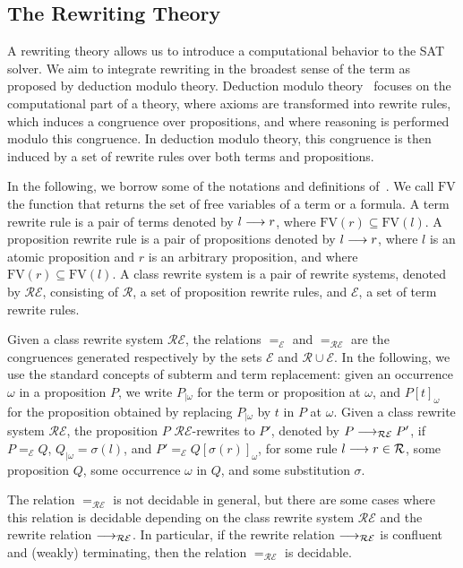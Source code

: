 \subsection{The Rewriting Theory}
\label{sec:rew}

A rewriting theory allows us to introduce a computational behavior to the SAT
solver. We aim to integrate rewriting in the broadest sense of the term as
proposed by deduction modulo theory. Deduction modulo theory~\cite{DA03} focuses
on the computational part of a theory, where axioms are transformed into rewrite
rules, which induces a congruence over propositions, and where reasoning is
performed modulo this congruence. In deduction modulo theory, this congruence is
then induced by a set of rewrite rules over both terms and propositions.

In the following, we borrow some of the notations and definitions
of~\cite{DA03}. We call $\mathrm{FV}$ the function that returns the set of
free variables of a term or a formula. A term rewrite rule is a pair of terms
denoted by $l\longrightarrow{}r$, where $\mathrm{FV}(r)\subseteq\mathrm{FV}(l)$. A
proposition rewrite rule is a pair of propositions denoted by $l\longrightarrow{}r$, where
$l$ is an atomic proposition and $r$ is an arbitrary proposition, and where
$\mathrm{FV}(r)\subseteq\mathrm{FV}(l)$. A class rewrite system is a pair of
rewrite systems, denoted by $\mathcal{RE}$, consisting of $\mathcal{R}$, a set
of proposition rewrite rules, and $\mathcal{E}$, a set of term rewrite rules.

Given a class rewrite system $\mathcal{RE}$, the relations $=_\mathcal{E}$ and
$=_\mathcal{RE}$ are the congruences generated respectively by the sets
$\mathcal{E}$ and $\mathcal{R}\cup\mathcal{E}$. In the following, we use the
standard concepts of subterm and term replacement: given an occurrence $\omega$
in a proposition $P$, we write $P_{|\omega}$ for the term or proposition at
$\omega$, and $P[t]_\omega$ for the proposition obtained by replacing
$P_{|\omega}$ by $t$ in $P$ at $\omega$. Given a class rewrite system
$\mathcal{RE}$, the proposition $P$ $\mathcal{RE}$-rewrites to $P'$, denoted by
$P\longrightarrow_\mathcal{RE}P'$, if $P=_\mathcal{E}Q$, $Q_{|\omega}=\sigma(l)$, and
$P'=_\mathcal{E}Q[\sigma(r)]_\omega$, for some rule $l\longrightarrow{}r\in\mathcal{R}$,
some proposition $Q$, some occurrence $\omega$ in $Q$, and some substitution
$\sigma$.

The relation $=_\mathcal{RE}$ is not decidable in general, but there are some
cases where this relation is decidable depending on the class rewrite system
$\mathcal{RE}$ and the rewrite relation $\longrightarrow_\mathcal{RE}$. In particular, if
the rewrite relation $\longrightarrow_\mathcal{RE}$ is confluent and (weakly) terminating,
then the relation $=_\mathcal{RE}$ is decidable.

